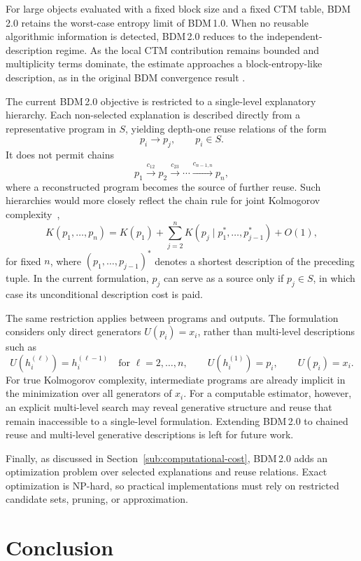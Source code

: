 \documentclass{article}
\begin{document}
For large objects evaluated with a fixed block size and a fixed CTM table, BDM\,2.0 retains the worst-case entropy limit of BDM\,1.0. When no reusable algorithmic information is detected, BDM\,2.0 reduces to the independent-description regime. As the local CTM contribution remains bounded and multiplicity terms dominate, the estimate approaches a block-entropy-like description, as in the original BDM convergence result \cite{zenil_decomposition_2018}.

The current BDM\,2.0 objective is restricted to a single-level explanatory hierarchy. Each non-selected explanation is described directly from a representative program in \(S\), yielding depth-one reuse relations of the form
\[
p_i \longrightarrow p_j,
\qquad p_i\in S.
\]
It does not permit chains
\[
p_1 \xrightarrow{c_{12}} p_2
\xrightarrow{c_{23}} \cdots
\xrightarrow{c_{n-1,n}} p_n,
\]
where a reconstructed program becomes the source of further reuse. Such hierarchies would more closely reflect the chain rule for joint Kolmogorov complexity~\cite{li_introduction_2019},
\[
K(p_1,\ldots,p_n)
=
K(p_1)
+
\sum_{j=2}^{n}
K\!\left(p_j \mid p_1^*,\ldots,p_{j-1}^*\right)
+
O(1),
\]
for fixed \(n\), where \((p_1,\ldots,p_{j-1})^*\) denotes a shortest description of the preceding tuple. In the current formulation, \(p_j\) can serve as a source only if \(p_j\in S\), in which case its unconditional description cost is paid. 

The same restriction applies between programs and outputs. The formulation considers only direct generators \(U(p_i)=x_i\), rather than multi-level descriptions such as
\[
U(h_i^{(\ell)})=h_i^{(\ell-1)}
\quad \text{for } \ell=2,\ldots,n,
\qquad
U(h_i^{(1)})=p_i,
\qquad
U(p_i)=x_i.
\]
For true Kolmogorov complexity, intermediate programs are already implicit in the minimization over all generators of \(x_i\). For a computable estimator, however, an explicit multi-level search may reveal generative structure and reuse that remain inaccessible to a single-level formulation. Extending BDM\,2.0 to chained reuse and multi-level generative descriptions is left for future work.


Finally, as discussed in Section~\ref{sub:computational-cost}, BDM\,2.0 adds an optimization problem over selected explanations and reuse relations. Exact optimization is NP-hard, so practical implementations must rely on restricted candidate sets, pruning, or approximation.


\section{Conclusion}
\end{document}
